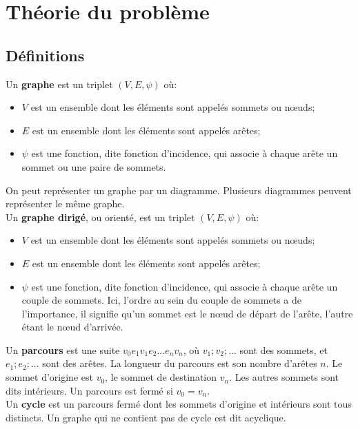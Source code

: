 \section{Théorie du problème}

\subsection{Définitions}
Un \textbf{graphe} est un triplet $(V,E,\psi)$ où:
\begin{itemize}
\item $V$ est un ensemble dont les éléments sont appelés sommets ou nœuds;
\item $E$ est un ensemble dont les éléments sont appelés arêtes;
\item $\psi$ est une fonction, dite fonction d'incidence, qui associe à chaque arête un sommet ou une paire de sommets.
\end{itemize}
On peut représenter un graphe par un diagramme. Plusieurs diagrammes peuvent représenter le même graphe.\\

Un \textbf{graphe dirigé}, ou orienté, est un triplet $(V,E,\psi)$ où:
\begin{itemize}
\item $V$ est un ensemble dont les éléments sont appelés sommets ou nœuds;
\item $E$ est un ensemble dont les éléments sont appelés arêtes;
\item $\psi$ est une fonction, dite fonction d'incidence, qui associe à chaque arête un couple de sommets. Ici, l'ordre au sein du couple de sommets a de l'importance, il signifie qu'un sommet est le nœud de départ de l'arête, l'autre étant le nœud d'arrivée.\\
\end{itemize}

Un \textbf{parcours} est une suite $v_0e_1v_1e_2...e_nv_n$, où $v_1;v_2;...$ sont des sommets, et $e_1;e_2;...$ sont des arêtes. La longueur du parcours est son nombre d'arêtes $n$. Le sommet d'origine est $v_0$, le sommet de destination $v_n$. Les autres sommets sont dits intérieurs. Un parcours est fermé si $v_0 = v_n$.\\


Un \textbf{cycle} est un parcours fermé dont les sommets d'origine et intérieurs sont tous distincts. Un graphe qui ne contient pas de cycle est dit acyclique.
